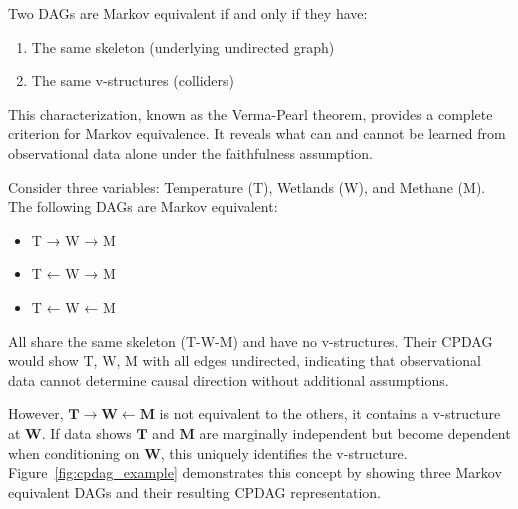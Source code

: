 Two DAGs are Markov equivalent if and only if they have:
\begin{enumerate}
	\item The same skeleton (underlying undirected graph)
	\item The same v-structures (colliders)
\end{enumerate}

This characterization, known as the Verma-Pearl theorem, provides a complete criterion for Markov equivalence. It reveals what can and cannot be learned from observational data alone under the faithfulness assumption.

Consider three variables: Temperature (T), Wetlands (W), and Methane (M). The following DAGs are Markov equivalent:
\begin{itemize}
	\item T → W → M
	\item T ← W → M
	\item T ← W ← M
\end{itemize}

All share the same skeleton (T-W-M) and have no v-structures. Their CPDAG would show T, W, M with all edges undirected, indicating that observational data cannot determine causal direction without additional assumptions.

However, $\mathbf{T} \rightarrow \mathbf{W} \leftarrow \mathbf{M}$ is not equivalent to the others, it contains a v-structure at $\mathbf{W}$. If data shows $\mathbf{T}$ and $\mathbf{M}$ are marginally independent but become dependent when conditioning on $\mathbf{W}$, this uniquely identifies the v-structure. Figure~\ref{fig:cpdag_example} demonstrates this concept by showing three Markov equivalent DAGs and their resulting CPDAG representation.

